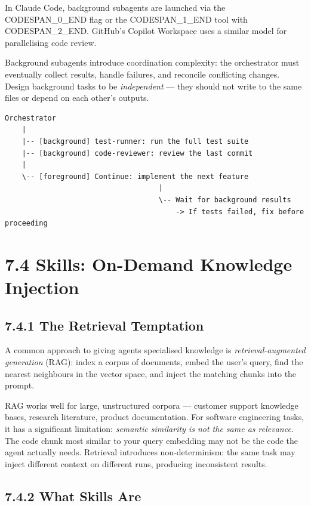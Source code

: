 \documentclass[11pt,a4paper]{book}
\begin{document}
In Claude Code, background subagents are launched via the CODESPAN\_0\_END flag or the CODESPAN\_1\_END tool with CODESPAN\_2\_END. GitHub's Copilot Workspace uses a similar model for parallelising code review.

Background subagents introduce coordination complexity: the orchestrator must eventually collect results, handle failures, and reconcile conflicting changes. Design background tasks to be \textit{independent} --- they should not write to the same files or depend on each other's outputs.

\begin{lstlisting}
Orchestrator
    |
    |-- [background] test-runner: run the full test suite
    |-- [background] code-reviewer: review the last commit
    |
    \-- [foreground] Continue: implement the next feature
                                    |
                                    \-- Wait for background results
                                        -> If tests failed, fix before proceeding
\end{lstlisting}

\medskip

\section{7.4 Skills: On-Demand Knowledge Injection}

\subsection{7.4.1 The Retrieval Temptation}

A common approach to giving agents specialised knowledge is \textit{retrieval-augmented generation} (RAG): index a corpus of documents, embed the user's query, find the nearest neighbours in the vector space, and inject the matching chunks into the prompt.

RAG works well for large, unstructured corpora --- customer support knowledge bases, research literature, product documentation. For software engineering tasks, it has a significant limitation: \textit{semantic similarity is not the same as relevance}. The code chunk most similar to your query embedding may not be the code the agent actually needs. Retrieval introduces non-determinism: the same task may inject different context on different runs, producing inconsistent results.

\subsection{7.4.2 What Skills Are}
\end{document}
